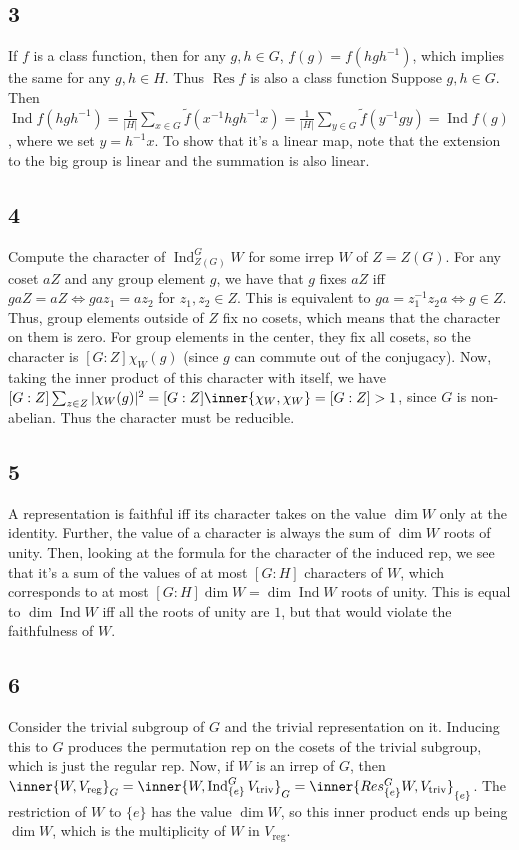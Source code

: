 \documentclass{article}
\DeclareMathOperator{\Res}{Res}
\DeclareMathOperator{\Ind}{Ind}
\begin{document}
\subsection*{3}
If $f$ is a class function, then for any $g,h\in G$, $f(g)=f(hgh^{-1})$, which implies the same for any $g,h\in H$. Thus $\Res f$ is also a class function
Suppose $g,h\in G$. Then $\Ind f(hgh^{-1})=\frac{1}{|H|}\sum_{x\in G}\tilde{f}(x^{-1}hgh^{-1}x)=\frac{1}{|H|}\sum_{y\in G}\tilde{f}(y^{-1}gy)=\Ind f(g)$, where we set $y=h^{-1}x$. To show that it's a linear map, note that the extension to the big group is linear and the summation is also linear.
\subsection*{4}
Compute the character of $\Ind_{Z(G)}^GW$ for some irrep $W$ of $Z=Z(G)$. For any coset $aZ$ and any group element $g$, we have that $g$ fixes $aZ$ iff $gaZ=aZ\iff gaz_1=az_2$ for $z_1,z_2\in Z$. This is equivalent to $ga=z_1^{-1}z_2a\iff g\in Z$. Thus, group elements outside of $Z$ fix no cosets, which means that the character on them is zero. For group elements in the center, they fix all cosets, so the character is $[G:Z]\chi_W(g)$ (since $g$ can commute out of the conjugacy). Now, taking the inner product of this character with itself, we have $[G:Z]\sum_{z\in Z}|\chi_W(g)|^2=[G:Z]\inner{\chi_W,\chi_W}=[G:Z]>1$, since $G$ is non-abelian. Thus the character must be reducible.
\subsection*{5}
A representation is faithful iff its character takes on the value $\dim W$ only at the identity. Further, the value of a character is always the sum of $\dim W$ roots of unity. Then, looking at the formula for the character of the induced rep, we see that it's a sum of the values of at most $[G:H]$ characters of $W$, which corresponds to at most $[G:H]\dim W=\dim\Ind W$ roots of unity. This is equal to $\dim\Ind W$ iff all the roots of unity are $1$, but that would violate the faithfulness of $W$.
\subsection*{6}
Consider the trivial subgroup of $G$ and the trivial representation on it. Inducing this to $G$ produces the permutation rep on the cosets of the trivial subgroup, which is just the regular rep. Now, if $W$ is an irrep of $G$, then $\inner{W,V_\text{reg}}_G=\inner{W,\Ind_{\{e\}}^GV_\text{triv}}_G=\inner{Res_{\{e\}}^GW,V_\text{triv}}_{\{e\}}$. The restriction of $W$ to $\{e\}$ has the value $\dim W$, so this inner product ends up being $\dim W$, which is the multiplicity of $W$ in $V_\text{reg}$.
\end{document}
